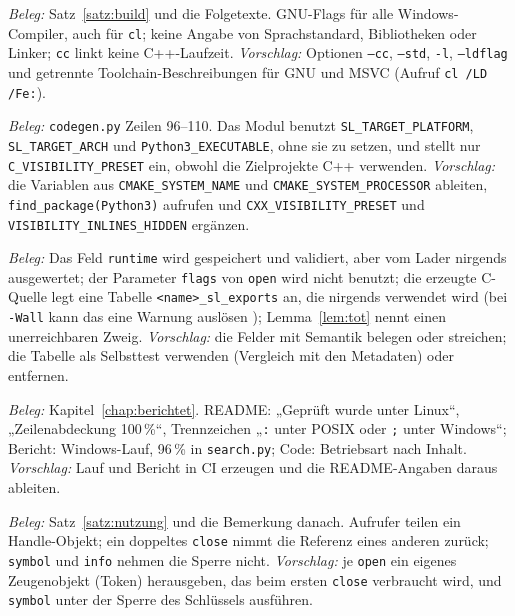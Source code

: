 \begin{befund}
	\label{bef:build}
	\emph{Beleg:} Satz~\ref{satz:build} und die Folgetexte. GNU-Flags für alle Windows-Compiler, auch für \texttt{cl}; keine Angabe von Sprachstandard, Bibliotheken oder Linker; \texttt{cc} linkt keine C++-Laufzeit. \emph{Vorschlag:} Optionen \texttt{--cc}, \texttt{--std}, \texttt{-l}, \texttt{--ldflag} und getrennte Toolchain-Beschreibungen für GNU und MSVC (Aufruf \texttt{cl /LD /Fe:}).
\end{befund}

\begin{befund}
	\label{bef:cmake}
	\emph{Beleg:} \texttt{codegen.py} Zeilen 96--110. Das Modul benutzt \texttt{SL\_TARGET\_PLATFORM}, \texttt{SL\_TARGET\_ARCH} und \texttt{Python3\_EXECUTABLE}, ohne sie zu setzen, und stellt nur \texttt{C\_VISIBILITY\_PRESET} ein, obwohl die Zielprojekte C++ verwenden. \emph{Vorschlag:} die Variablen aus \texttt{CMAKE\_SYSTEM\_NAME} und \texttt{CMAKE\_SYSTEM\_PROCESSOR} ableiten, \texttt{find\_package(Python3)} aufrufen und \texttt{CXX\_VISIBILITY\_PRESET} und \texttt{VISIBILITY\_INLINES\_HIDDEN} ergänzen.
\end{befund}

\begin{befund}
	\label{bef:dead}
	\emph{Beleg:} Das Feld \texttt{runtime} wird gespeichert und validiert, aber vom Lader nirgends ausgewertet; der Parameter \texttt{flags} von \texttt{open} wird nicht benutzt; die erzeugte C-Quelle legt eine Tabelle \texttt{<name>\_sl\_exports} an, die nirgends verwendet wird (bei \texttt{-Wall} kann das eine Warnung auslösen ); Lemma~\ref{lem:tot} nennt einen unerreichbaren Zweig. \emph{Vorschlag:} die Felder mit Semantik belegen oder streichen; die Tabelle als Selbsttest verwenden (Vergleich mit den Metadaten) oder entfernen.
\end{befund}

\begin{befund}[B12: Dokumentationsstand]
	\label{bef:doku}
	\emph{Beleg:} Kapitel~\ref{chap:berichtet}. README: „Geprüft wurde unter Linux“, „Zeilenabdeckung 100\,\%“, Trennzeichen „\texttt{:} unter POSIX oder \texttt{;} unter Windows“; Bericht: Windows-Lauf, 96\,\% in \texttt{search.py}; Code: Betriebsart nach Inhalt. \emph{Vorschlag:} Lauf und Bericht in CI erzeugen und die README-Angaben daraus ableiten.
\end{befund}

\begin{befund}
	\label{bef:handle}
	\emph{Beleg:} Satz~\ref{satz:nutzung} und die Bemerkung danach. Aufrufer teilen ein Handle-Objekt; ein doppeltes \texttt{close} nimmt die Referenz eines anderen zurück; \texttt{symbol} und \texttt{info} nehmen die Sperre nicht. \emph{Vorschlag:} je \texttt{open} ein eigenes Zeugenobjekt (Token) herausgeben, das beim ersten \texttt{close} verbraucht wird, und \texttt{symbol} unter der Sperre des Schlüssels ausführen.
\end{befund}

